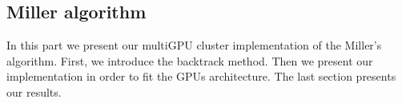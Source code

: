 \subsection{Miller algorithm}

In this part we present our multiGPU cluster implementation of the Miller's algorithm. First, we introduce the backtrack method. Then we present our implementation in order to fit the GPUs architecture. The last section presents our results. 





